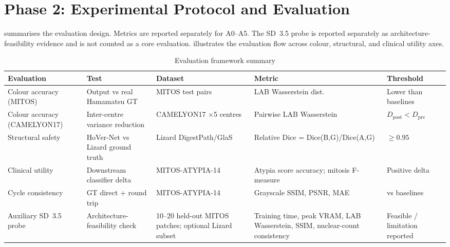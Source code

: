 \documentclass[a4paper,twoside,12pt]{report}
\begin{document}
\section{Phase 2: Experimental Protocol and Evaluation}
\label{sec:experiments}

 summarises the evaluation design. Metrics are reported separately for A0--A5. The SD~3.5 probe is reported separately as architecture-feasibility evidence and is not counted as a core evaluation.  illustrates the evaluation flow across colour, structural, and clinical utility axes.

\begin{table}[ht]
\centering
\scriptsize
\setlength{\tabcolsep}{2pt}
\renewcommand{\arraystretch}{1.12}
\caption{Evaluation framework summary}
\label{tab:eval}
\begin{tabularx}{\textwidth}{L{0.17\textwidth}L{0.20\textwidth}L{0.17\textwidth}L{0.25\textwidth}Y}
\toprule
\textbf{Evaluation} & \textbf{Test} & \textbf{Dataset} & \textbf{Metric} & \textbf{Threshold} \\
\midrule
Colour accuracy (MITOS) & Output vs real Hamamatsu GT & MITOS test pairs & LAB Wasserstein dist. & Lower than baselines \\
\midrule
Colour accuracy (CAMELYON17) & Inter-centre variance reduction & CAMELYON17 $\times$5 centres & Pairwise LAB Wasserstein & $D_{\text{post}} < D_{\text{pre}}$ \\
\midrule
Structural safety & HoVer-Net vs Lizard ground truth & Lizard DigestPath/GlaS & Relative Dice = Dice(B,G)/Dice(A,G) & $\geq 0.95$ \\
\midrule
Clinical utility & Downstream classifier delta & MITOS-ATYPIA-14 & Atypia score accuracy; mitosis F-measure & Positive delta \\
\midrule
Cycle consistency & GT direct + round trip & MITOS-ATYPIA-14 & Grayscale SSIM, PSNR, MAE & vs baselines \\
\midrule
Auxiliary SD~3.5 probe & Architecture-feasibility check & 10--20 held-out MITOS patches; optional Lizard subset & Training time, peak VRAM, LAB Wasserstein, SSIM, nuclear-count consistency & Feasible / limitation reported \\
\bottomrule
\end{tabularx}
\end{table}
\end{document}
